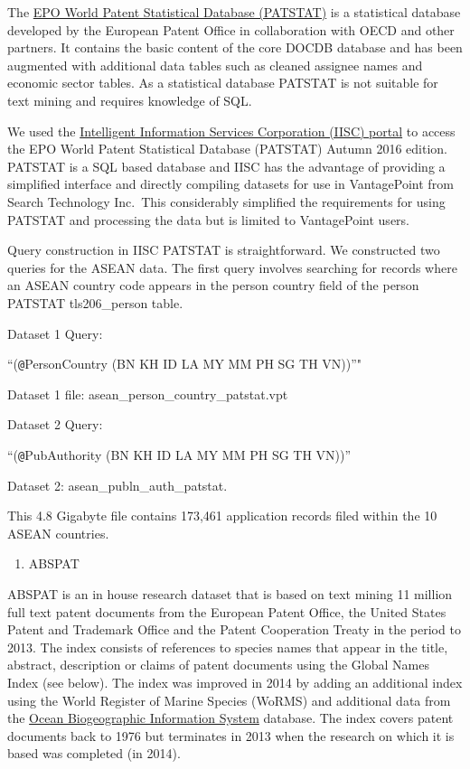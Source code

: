 \documentclass[openany]{book}
\providecommand{\tightlist}{%
  \setlength{\itemsep}{0pt}\setlength{\parskip}{0pt}}
\theoremstyle{definition}
\theoremstyle{definition}
\theoremstyle{definition}
\theoremstyle{remark}
\begin{document}
The
\href{https://www.epo.org/searching-for-patents/business/patstat.html\#tab-1}{EPO
World Patent Statistical Database (PATSTAT)} is a statistical database
developed by the European Patent Office in collaboration with OECD and
other partners. It contains the basic content of the core DOCDB database
and has been augmented with additional data tables such as cleaned
assignee names and economic sector tables. As a statistical database
PATSTAT is not suitable for text mining and requires knowledge of SQL.

We used the
\href{http://www.patstat.org/Patstat/PatstatApp/app/index.html\#/disclaimer}{Intelligent
Information Services Corporation (IISC) portal} to access the EPO World
Patent Statistical Database (PATSTAT) Autumn 2016 edition. PATSTAT is a
SQL based database and IISC has the advantage of providing a simplified
interface and directly compiling datasets for use in VantagePoint from
Search Technology Inc.~This considerably simplified the requirements for
using PATSTAT and processing the data but is limited to VantagePoint
users.

Query construction in IISC PATSTAT is straightforward. We constructed
two queries for the ASEAN data. The first query involves searching for
records where an ASEAN country code appears in the person country field
of the person PATSTAT tls206\_person table.

Dataset 1 Query:

``(\texttt{@}PersonCountry (BN \textbar{} KH \textbar{} ID \textbar{} LA
\textbar{} MY \textbar{} MM \textbar{} PH \textbar{} SG \textbar{} TH
\textbar{} VN))''"

Dataset 1 file: asean\_person\_country\_patstat.vpt

Dataset 2 Query:

``(\texttt{@}PubAuthority (BN \textbar{} KH \textbar{} ID \textbar{} LA
\textbar{} MY \textbar{} MM \textbar{} PH \textbar{} SG \textbar{} TH
\textbar{} VN))''

Dataset 2: asean\_publn\_auth\_patstat.

This 4.8 Gigabyte file contains 173,461 application records filed within
the 10 ASEAN countries.

\begin{enumerate}
\def\labelenumi{\arabic{enumi}.}
\setcounter{enumi}{1}
\tightlist
\item
  ABSPAT
\end{enumerate}

ABSPAT is an in house research dataset that is based on text mining 11
million full text patent documents from the European Patent Office, the
United States Patent and Trademark Office and the Patent Cooperation
Treaty in the period to 2013. The index consists of references to
species names that appear in the title, abstract, description or claims
of patent documents using the Global Names Index (see below). The index
was improved in 2014 by adding an additional index using the World
Register of Marine Species (WoRMS) and additional data from the
\href{http://www.iobis.org/}{Ocean Biogeographic Information System}
database. The index covers patent documents back to 1976 but terminates
in 2013 when the research on which it is based was completed (in 2014).
\end{document}
